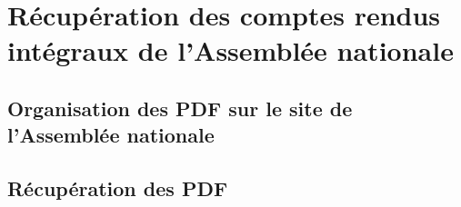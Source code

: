 \section[Récupération des comptes rendus intégraux]{Récupération des comptes rendus intégraux de l'Assemblée nationale}

\subsection{Organisation des PDF sur le site de l'Assemblée nationale}

\subsection{Récupération des PDF}
